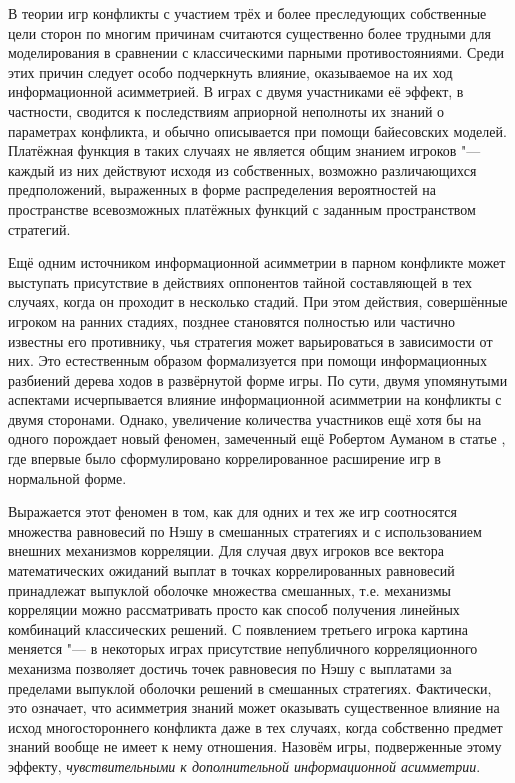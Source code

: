 
{\actuality} В теории игр конфликты с участием трёх и более преследующих собственные цели сторон по многим причинам считаются существенно более трудными для моделирования в сравнении с классическими парными противостояниями. Среди этих причин следует особо подчеркнуть влияние, оказываемое на их ход информационной асимметрией. В играх с двумя участниками её эффект, в частности, сводится к последствиям априорной неполноты их знаний о параметрах конфликта, и обычно описывается при помощи байесовских моделей. Платёжная функция в таких случаях не является общим знанием игроков "--- каждый из них действуют исходя из собственных, возможно различающихся предположений, выраженных в форме распределения вероятностей на пространстве всевозможных платёжных функций с заданным пространством стратегий.

Ещё одним источником информационной асимметрии в парном конфликте может выступать присутствие в действиях оппонентов тайной составляющей в тех случаях, когда он проходит в несколько стадий. При этом действия, совершённые игроком на ранних стадиях, позднее становятся полностью или частично известны его противнику, чья стратегия может варьироваться в зависимости от них. Это естественным образом формализуется при помощи информационных разбиений дерева ходов в развёрнутой форме игры. По сути, двумя упомянутыми аспектами исчерпывается влияние информационной асимметрии на конфликты с двумя сторонами. Однако, увеличение количества участников ещё хотя бы на одного порождает новый феномен, замеченный ещё Робертом Ауманом в статье \fixme{[1]}, где впервые было сформулировано коррелированное расширение игр в нормальной форме.

Выражается этот феномен в том, как для одних и тех же игр соотносятся множества равновесий по Нэшу в смешанных стратегиях и с использованием внешних механизмов корреляции. Для случая двух игроков все вектора математических ожиданий выплат в точках коррелированных равновесий принадлежат выпуклой оболочке множества смешанных, т.\:е. механизмы корреляции можно рассматривать просто как способ получения линейных комбинаций классических решений. С появлением третьего игрока картина меняется "--- в некоторых играх присутствие непубличного корреляционного механизма позволяет достичь точек равновесия по Нэшу с выплатами за пределами выпуклой оболочки решений в смешанных стратегиях. Фактически, это означает, что асимметрия знаний может оказывать существенное влияние на исход многостороннего конфликта даже в тех случаях, когда собственно предмет знаний вообще не имеет к нему отношения. Назовём игры, подверженные этому эффекту, \emph{чувствительными к дополнительной информационной асимметрии}.

